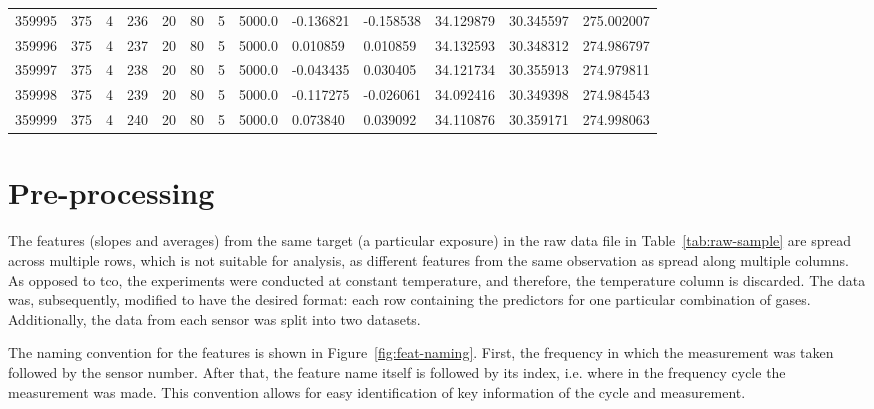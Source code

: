 \begin{table}[h]
{\begin{tabular}{p{1.5cm}p{1.3cm}p{0.8cm}p{1.3cm}p{0.8cm}p{0.8cm}p{1.8cm}p{1.8cm}p{1.8cm}p{1.8cm}p{1.8cm}p{1.8cm}p{1.8cm}}
		359995 &          375 &         4 &        236 &        20 &         80 &          5 &     5000.0 &              -0.136821 &              -0.158538 &                34.129879 &                30.345597 &              275.002007 \\
		359996 &          375 &         4 &        237 &        20 &         80 &          5 &     5000.0 &               0.010859 &               0.010859 &                34.132593 &                30.348312 &              274.986797 \\
		359997 &          375 &         4 &        238 &        20 &         80 &          5 &     5000.0 &              -0.043435 &               0.030405 &                34.121734 &                30.355913 &              274.979811 \\
		359998 &          375 &         4 &        239 &        20 &         80 &          5 &     5000.0 &              -0.117275 &              -0.026061 &                34.092416 &                30.349398 &              274.984543 \\
		359999 &          375 &         4 &        240 &        20 &         80 &          5 &     5000.0 &               0.073840 &               0.039092 &                34.110876 &                30.359171 &              274.998063 \\
		\bottomrule[0.5mm]
	\end{tabular}}
\end{table}

\newpage
\section{Pre-processing}
\label{sec:preprocessing}

The features (slopes and averages) from the same target (a particular exposure) in the raw data file in Table~\ref{tab:raw-sample} are spread across multiple rows, which is not suitable for analysis, as different features from the same observation as spread along multiple columns. As opposed to \acrshort{tco}, the experiments were conducted at constant temperature, and therefore, the temperature column is discarded. The data was, subsequently, modified to have the desired format: each row containing the predictors for one particular combination of gases. Additionally, the data from each sensor was split into  two datasets. 

The naming convention for the features is shown in Figure~\ref{fig:feat-naming}. First, the frequency in which the measurement was taken followed by the sensor number. After that, the feature name itself is followed by its index, i.e. where in the frequency cycle the measurement was made. This convention allows for easy identification of key information of the cycle and measurement.

